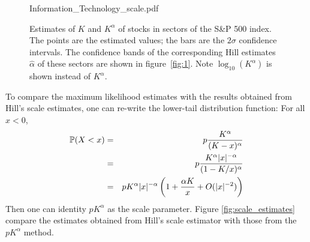 \documentclass[11pt,a4]{amsart}
\renewcommand{\P }{{\mathbb P}}
\newcommand{\1}{{\mathbf 1}}
\begin{document}
\begin{figure}[htb!]
\begin{minipage}{0.45\linewidth}
    {Information_Technology_scale.pdf}
  \end{minipage}
  \caption{\small Estimates of $K$ and $K^\alpha$ of stocks in sectors
    of the S\&P 500 index. The points are the estimated values; the bars are
    the $2\sigma$ confidence intervals. The confidence bands of the
    corresponding Hill estimates $\hat \alpha$ of these sectors are
    shown in figure~\ref{fig:1}. Note $\log_{10}(K^\alpha)$ is shown
    instead of $K^\alpha$.
  }
  \label{fig:sectors_parameters}
\end{figure}
To compare the maximum likelihood estimates with the results obtained
from Hill's scale estimates, one can re-write the lower-tail
distribution function: For all $x < 0$,
\begin{eqnarray*}
  \P(X < x)
  &=&
  p {K^\alpha \over (K - x)^\alpha} \\
  &=&
  p {K^\alpha |x|^{-\alpha} \over (1 - K/x)^\alpha} \\
  &=&
  p K^\alpha |x|^{-\alpha} \left(
  1 + {\alpha K \over x} + O(|x|^{-2})
  \right)
\end{eqnarray*}
Then one can identity $p K^\alpha$ as the scale parameter. Figure
\ref{fig:scale_estimates} compare the estimates obtained
from Hill's scale estimator with those from the $p K^\alpha$ method.
\end{document}
